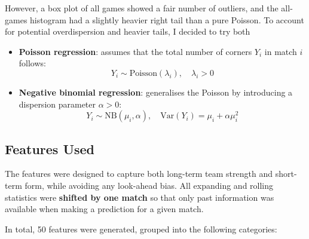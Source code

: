 \documentclass[12pt]{article}
\begin{document}
However, a box plot of all games showed a fair number of outliers, and the all-games histogram had a slightly heavier right tail than a pure Poisson.  
To account for potential overdispersion and heavier tails, I decided to try both

\begin{itemize}
    \item \textbf{Poisson regression}: assumes that the total number of corners $Y_i$ in match $i$ follows:
    \[
    Y_i \sim \mathrm{Poisson}(\lambda_i), \quad \lambda_i > 0
    \]

    \item \textbf{Negative binomial regression}: generalises the Poisson by introducing a dispersion parameter $\alpha > 0$:
    \[
    Y_i \sim \mathrm{NB}(\mu_i, \alpha), \quad \mathrm{Var}(Y_i) = \mu_i + \alpha \mu_i^2
    \]
\end{itemize}

\subsection*{Features Used}

The features were designed to capture both long-term team strength and short-term form, while avoiding any look-ahead bias.  
All expanding and rolling statistics were \textbf{shifted by one match} so that only past information was available when making a prediction for a given match.  

In total, 50 features were generated, grouped into the following categories:
\end{document}
